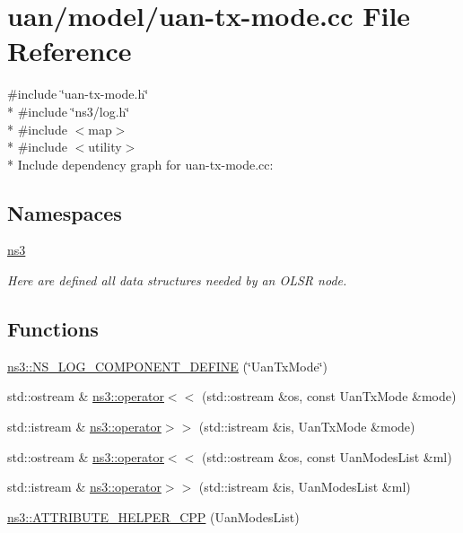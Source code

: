 \hypertarget{uan-tx-mode_8cc}{}\section{uan/model/uan-\/tx-\/mode.cc File Reference}
\label{uan-tx-mode_8cc}
{\ttfamily \#include \char`\"{}uan-\/tx-\/mode.\+h\char`\"{}}\\*
{\ttfamily \#include \char`\"{}ns3/log.\+h\char`\"{}}\\*
{\ttfamily \#include $<$map$>$}\\*
{\ttfamily \#include $<$utility$>$}\\*
Include dependency graph for uan-\/tx-\/mode.cc\+:
\subsection*{Namespaces}
\begin{DoxyCompactItemize}
\item 
 \hyperlink{namespacens3}{ns3}
\begin{DoxyCompactList}\small\item\em Here are defined all data structures needed by an O\+L\+SR node. \end{DoxyCompactList}\end{DoxyCompactItemize}
\subsection*{Functions}
\begin{DoxyCompactItemize}
\item 
\hyperlink{namespacens3_aeec4e920be4edcdb2dcedaab78212477}{ns3\+::\+N\+S\+\_\+\+L\+O\+G\+\_\+\+C\+O\+M\+P\+O\+N\+E\+N\+T\+\_\+\+D\+E\+F\+I\+NE} (\char`\"{}Uan\+Tx\+Mode\char`\"{})
\item 
std\+::ostream \& \hyperlink{namespacens3_a518b42f0d94e83df55241b1e6e6ab04c}{ns3\+::operator$<$$<$} (std\+::ostream \&os, const Uan\+Tx\+Mode \&mode)
\item 
std\+::istream \& \hyperlink{namespacens3_a4bc5039937c78a48428378841e2b6256}{ns3\+::operator$>$$>$} (std\+::istream \&is, Uan\+Tx\+Mode \&mode)
\item 
std\+::ostream \& \hyperlink{namespacens3_a0ab3027b37fdc03993b6752cab300a1b}{ns3\+::operator$<$$<$} (std\+::ostream \&os, const Uan\+Modes\+List \&ml)
\item 
std\+::istream \& \hyperlink{namespacens3_a41dffd192b16c0a3293030f621e78924}{ns3\+::operator$>$$>$} (std\+::istream \&is, Uan\+Modes\+List \&ml)
\item 
\hyperlink{namespacens3_af1fafc31c3f13b0e5747d4e863c339b9}{ns3\+::\+A\+T\+T\+R\+I\+B\+U\+T\+E\+\_\+\+H\+E\+L\+P\+E\+R\+\_\+\+C\+PP} (Uan\+Modes\+List)
\end{DoxyCompactItemize}
